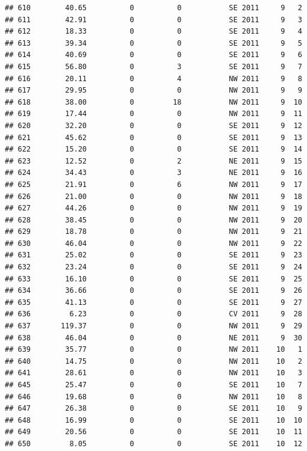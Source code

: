\documentclass[
]{article}
\begin{document}
\begin{verbatim}
## 610        40.65          0          0           SE 2011     9   2
## 611        42.91          0          0           SE 2011     9   3
## 612        18.33          0          0           SE 2011     9   4
## 613        39.34          0          0           SE 2011     9   5
## 614        40.69          0          0           SE 2011     9   6
## 615        56.80          0          3           SE 2011     9   7
## 616        20.11          0          4           NW 2011     9   8
## 617        29.95          0          0           NW 2011     9   9
## 618        38.00          0         18           NW 2011     9  10
## 619        17.44          0          0           NW 2011     9  11
## 620        32.20          0          0           SE 2011     9  12
## 621        45.62          0          0           SE 2011     9  13
## 622        15.20          0          0           SE 2011     9  14
## 623        12.52          0          2           NE 2011     9  15
## 624        34.43          0          3           NE 2011     9  16
## 625        21.91          0          6           NW 2011     9  17
## 626        21.00          0          0           NW 2011     9  18
## 627        44.26          0          0           NW 2011     9  19
## 628        38.45          0          0           NW 2011     9  20
## 629        18.78          0          0           NW 2011     9  21
## 630        46.04          0          0           NW 2011     9  22
## 631        25.02          0          0           SE 2011     9  23
## 632        23.24          0          0           SE 2011     9  24
## 633        16.10          0          0           SE 2011     9  25
## 634        36.66          0          0           SE 2011     9  26
## 635        41.13          0          0           SE 2011     9  27
## 636         6.23          0          0           CV 2011     9  28
## 637       119.37          0          0           NW 2011     9  29
## 638        46.04          0          0           NE 2011     9  30
## 639        35.77          0          0           NW 2011    10   1
## 640        14.75          0          0           NW 2011    10   2
## 641        28.61          0          0           NW 2011    10   3
## 645        25.47          0          0           SE 2011    10   7
## 646        19.68          0          0           NW 2011    10   8
## 647        26.38          0          0           SE 2011    10   9
## 648        16.99          0          0           SE 2011    10  10
## 649        20.56          0          0           SE 2011    10  11
## 650         8.05          0          0           SE 2011    10  12

\end{verbatim}
\end{document}
